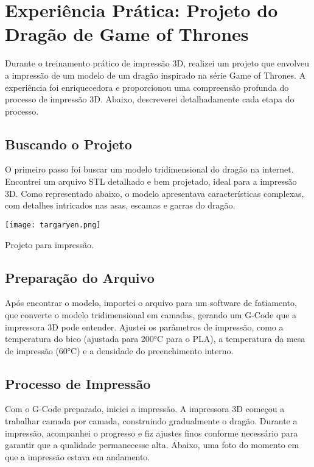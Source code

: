 \documentclass[
]{book}
\begin{document}
\section{Experiência Prática: Projeto do Dragão de Game of Thrones}\label{experiuxeancia-pruxe1tica-projeto-do-draguxe3o-de-game-of-thrones}

Durante o treinamento prático de impressão 3D, realizei um projeto que envolveu a impressão de um modelo de um dragão inspirado na série Game of Thrones. A experiência foi enriquecedora e proporcionou uma compreensão profunda do processo de impressão 3D. Abaixo, descreverei detalhadamente cada etapa do processo.

\subsection{Buscando o Projeto}\label{buscando-o-projeto}

O primeiro passo foi buscar um modelo tridimensional do dragão na internet. Encontrei um arquivo STL detalhado e bem projetado, ideal para a impressão 3D. Como representado abaixo, o modelo apresentava características complexas, com detalhes intricados nas asas, escamas e garras do dragão.

\texttt{[image: targaryen.png]}

Projeto para impressão.

\subsection{Preparação do Arquivo}\label{preparauxe7uxe3o-do-arquivo}

Após encontrar o modelo, importei o arquivo para um software de fatiamento, que converte o modelo tridimensional em camadas, gerando um G-Code que a impressora 3D pode entender. Ajustei os parâmetros de impressão, como a temperatura do bico (ajustada para 200°C para o PLA), a temperatura da mesa de impressão (60°C) e a densidade do preenchimento interno.

\subsection{Processo de Impressão}\label{processo-de-impressuxe3o}

Com o G-Code preparado, iniciei a impressão. A impressora 3D começou a trabalhar camada por camada, construindo gradualmente o dragão. Durante a impressão, acompanhei o progresso e fiz ajustes finos conforme necessário para garantir que a qualidade permanecesse alta. Abaixo, uma foto do momento em que a impressão estava em andamento.
\end{document}
